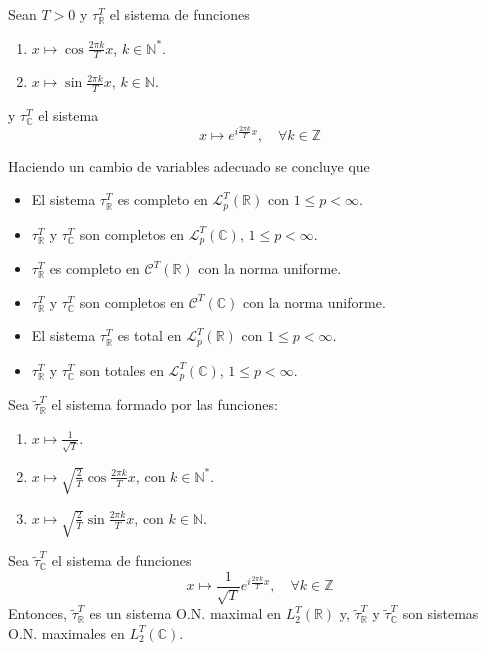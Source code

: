 \documentclass[12pt]{report}
\theoremstyle{largebreak}
\begin{document}
    \begin{mydef}
        Sean $T>0$ y $\tau_{\mathbb{R}}^T$ el sistema de funciones
        \begin{enumerate}
            \item $x\mapsto \cos \frac{2\pi k}{T}x$, $k\in\mathbb{N}^*$.
            \item $x\mapsto \sin \frac{2\pi k}{T}x$, $k\in\mathbb{N}$.
        \end{enumerate}
        y $\tau_{\mathbb{C}}^T$ el sistema
        \begin{equation*}
            x\mapsto e^{i\frac{2\pi k}{T}x },\quad\forall k\in\mathbb{Z}
        \end{equation*}
    \end{mydef}

    \begin{obs}
        Haciendo un cambio de variables adecuado se concluye que
        \begin{itemize}
            \item El sistema $\tau_{\mathbb{R}}^T$ es completo en $\mathcal{L}_p^T(\mathbb{R})$ con $1\leq p<\infty$.
            \item $\tau_{\mathbb{R}}^T$ y $\tau_{\mathbb{C}}^T$ son completos en $\mathcal{L}_p^T(\mathbb{C})$, $1\leq p<\infty$.
            \item $\tau_{\mathbb{R}}^T$ es completo en $\mathcal{C}^T(\mathbb{R})$ con la norma uniforme.
            \item $\tau_{\mathbb{R}}^T$ y $\tau_{\mathbb{C}}^T$ son completos en $\mathcal{C}^T(\mathbb{C})$ con la norma uniforme.
            \item El sistema $\tau_{\mathbb{R}}^T$ es total en $\mathcal{L}_p^T(\mathbb{R})$ con $1\leq p<\infty$.
            \item $\tau_{\mathbb{R}}^T$ y $\tau_{\mathbb{C}}^T$ son totales en $\mathcal{L}_p^T(\mathbb{C})$, $1\leq p<\infty$.
        \end{itemize}
    \end{obs}

    \begin{obs}
        Sea $\tilde{\tau}_{\mathbb{R}}^T$ el sistema formado por las funciones:
        \begin{enumerate}
            \item $x\mapsto\frac{1}{\sqrt{T}}$.
            \item $x\mapsto\sqrt{\frac{2}{T}}\cos \frac{2\pi k}{T}x$, con $k\in\mathbb{N}^*$.
            \item $x\mapsto\sqrt{\frac{2}{T}}\sin \frac{2\pi k}{T}x$, con $k\in\mathbb{N}$.
        \end{enumerate}
        Sea $\tilde{\tau}^T_{\mathbb{C}}$ el sistema de funciones
        \begin{equation*}
            x\mapsto\frac{1}{\sqrt{T}}e^{i\frac{2\pi k}{T}x},\quad\forall k\in\mathbb{Z}
        \end{equation*}
        Entonces, $\tilde{\tau}^T_{\mathbb{R}}$ es un sistema O.N. maximal en $L_2^{T}(\mathbb{R})$ y, $\tilde{\tau}^T_{\mathbb{R}}$ y $\tilde{\tau}^T_{\mathbb{C}}$ son sistemas O.N. maximales en $L_2^T(\mathbb{C})$.
    \end{obs}
\end{document}
